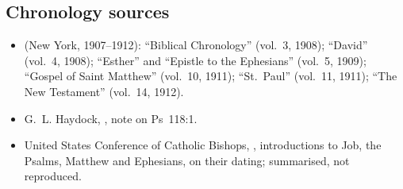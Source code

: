 {\subsection*{Chronology sources}
\begin{itemize}
\item {} (New York, 1907--1912): ``Biblical Chronology'' (vol.~3, 1908); ``David'' (vol.~4, 1908); ``Esther'' and ``Epistle to the Ephesians'' (vol.~5, 1909); ``Gospel of Saint Matthew'' (vol.~10, 1911); ``St.\ Paul'' (vol.~11, 1911); ``The New Testament'' (vol.~14, 1912).
\item G.~L. Haydock, , note on Ps~118:1.
\item United States Conference of Catholic Bishops, , introductions to Job, the Psalms, Matthew and Ephesians, on their dating; summarised, not reproduced.
\end{itemize}
\par}
